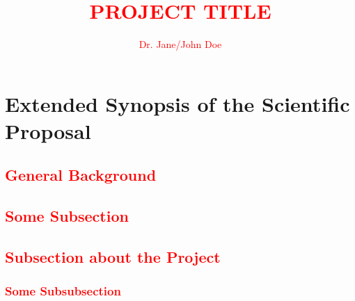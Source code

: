 \documentclass[STG]{ercgrant}
\author{\textcolor{red}{Dr. Jane/John Doe}}
\title{\textcolor{red}{PROJECT TITLE}}
\begin{document}
\maketitle

\begin{abstract}
	\textcolor{red}{
		
	}
\end{abstract}



\section{Extended Synopsis of the Scientific Proposal}

\subsection{\textcolor{red}{General Background}}

\textcolor{red}{\blindtext[2]}


\subsection{\textcolor{red}{Some Subsection}}


\textcolor{red}{\blindtext[2]}

\begin{figure}
	\begin{center}
		\caption{\textcolor{red}{\blindtext}}
		\label{fig:example}
	\end{center}
	\vspace{-0.5cm}
\end{figure}

\textcolor{red}{\blindtext[2]}

\subsection{\textcolor{red}{Subsection about the Project}}

\textcolor{red}{\blindtext[2]}

\subsubsection{\textcolor{red}{Some Subsubsection}}

\textcolor{red}{\blindtext[2]}
\end{document}

